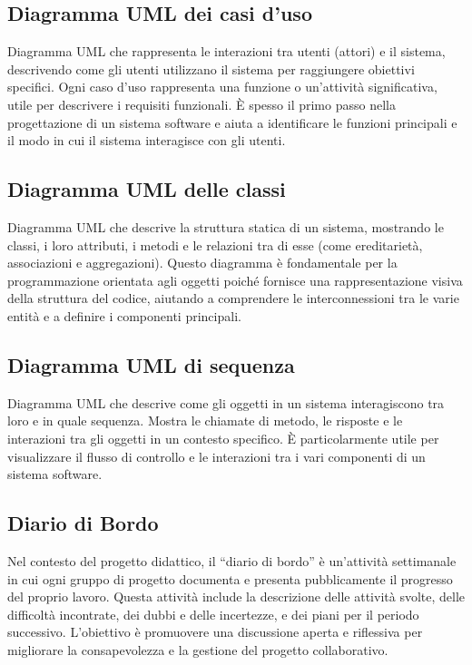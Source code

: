 \subsection*{Diagramma UML dei casi d'uso}
Diagramma UML che rappresenta le interazioni tra utenti (attori) e il sistema, descrivendo come gli utenti utilizzano il sistema per raggiungere obiettivi 
specifici. Ogni caso d'uso rappresenta una funzione o un'attività significativa, utile per descrivere i requisiti funzionali. È spesso il primo passo nella 
progettazione di un sistema software e aiuta a identificare le funzioni principali e il modo in cui il sistema interagisce con gli utenti.

\subsection*{Diagramma UML delle classi}
Diagramma UML che descrive la struttura statica di un sistema, mostrando le classi, i loro attributi, i metodi e le relazioni tra di esse (come ereditarietà, 
associazioni e aggregazioni). Questo diagramma è fondamentale per la programmazione orientata agli oggetti poiché fornisce una rappresentazione visiva della 
struttura del codice, aiutando a comprendere le interconnessioni tra le varie entità e a definire i componenti principali.

\hypertarget{sec:diagramma_uml_sequenza}{}
\subsection*{Diagramma UML di sequenza}
Diagramma UML che descrive come gli oggetti in un sistema interagiscono tra loro e in quale sequenza. Mostra le chiamate di metodo, le risposte e le interazioni
tra gli oggetti in un contesto specifico. È particolarmente utile per visualizzare il flusso di controllo e le interazioni tra i vari componenti di un sistema
software.

\hypertarget{sec:diario_di_bordo}{}
\subsection*{Diario di Bordo}
Nel contesto del progetto didattico, il “diario di bordo” è un’attività settimanale in cui ogni gruppo di progetto documenta e presenta pubblicamente il progresso del proprio lavoro. 
Questa attività include la descrizione delle attività svolte, delle difficoltà incontrate, dei dubbi e delle incertezze, e dei piani per il periodo successivo. 
L’obiettivo è promuovere una discussione aperta e riflessiva per migliorare la consapevolezza e la gestione del progetto collaborativo.

